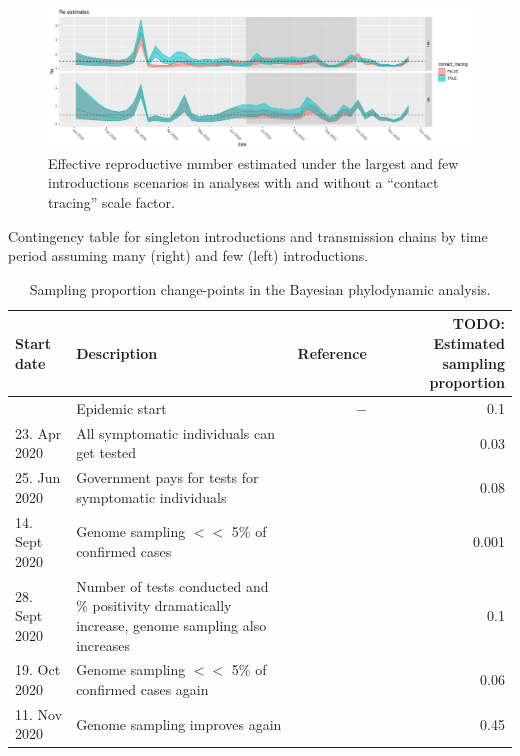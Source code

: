\documentclass[9pt,twoside,lineno]{pnas-new}
\begin{document}
\begin{figure}[tbhp]
\centering
\includegraphics[width=.8\linewidth]{figures/Re_noSampUB.pdf}
\caption{Effective reproductive number estimated under the largest and few introductions scenarios in analyses with and without a ``contact tracing'' scale factor.}  
\label{fig:re}
\end{figure}


\newpage
\begin{table}
\caption{Contingency table for singleton introductions and transmission chains by time period assuming many (right) and few (left)  introductions.}


\label{tab:lockdown-contingency}
\end{table}

\newpage
\begin{table}%
\centering
\caption{Sampling proportion change-points in the Bayesian phylodynamic analysis.}
\begin{tabular}{lp{6cm}rr}
Start date & Description & Reference & TODO: Estimated sampling proportion \\
\midrule
 & Epidemic start & $-$ & 0.1 \\
23. Apr 2020 & All symptomatic individuals can get tested &  & 0.03 \\
25. Jun 2020 & Government pays for tests for symptomatic individuals &  & 0.08 \\
14. Sept 2020 & Genome sampling $<<$ 5\% of confirmed cases & & 0.001 \\
28. Sept 2020 & Number of tests conducted and \% positivity dramatically increase, genome sampling also increases & & 0.1 \\
19. Oct 2020 & Genome sampling $<<$ 5\% of confirmed cases again & & 0.06 \\
11. Nov 2020 & Genome sampling improves again & & 0.45 \\
\bottomrule
\end{tabular}
\end{table}
\end{document}
